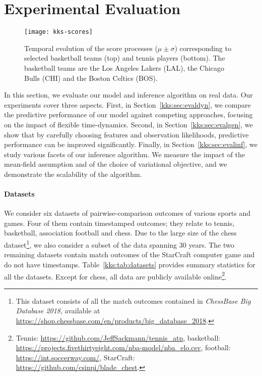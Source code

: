 \section{Experimental Evaluation}
\label{kks:sec:eval}

\begin{figure*}[t]
	\texttt{[image: kks-scores]}
	\caption{
		Temporal evolution of the score processes ($\mu \pm \sigma$) corresponding to selected basketball teams (top) and tennis players (bottom).
		The basketball teams are the Los Angeles Lakers (LAL), the Chicago Bulls (CHI) and the Boston Celtics (BOS).}
	\label{kks:fig:scores}
\end{figure*}

In this section, we evaluate our model and inference algorithm on real data.
Our experiments cover three aspects.
First, in Section~\ref{kks:sec:evaldyn}, we compare the predictive performance of our model against competing approaches, focusing on the impact of flexible time-dynamics.
Second, in Section~\ref{kks:sec:evalgen}, we show that by carefully choosing features and observation likelihoods, predictive performance can be improved significantly.
Finally, in Section~\ref{kks:sec:evalinf}, we study various facets of our inference algorithm.
We measure the impact of the mean-field assumption and of the choice of variational objective, and we demonstrate the scalability of the algorithm.

\paragraph{Datasets}
We consider six datasets of pairwise-comparison outcomes of various sports and games.
Four of them contain timestamped outcomes; they relate to tennis, basketball, association football and chess.
Due to the large size of the chess dataset\footnote{%
	This dataset consists of all the match outcomes contained in \emph{ChessBase Big Database 2018}, available at \url{https://shop.chessbase.com/en/products/big_database_2018}.}, we also consider a subset of the data spanning 30 years.
The two remaining datasets contain match outcomes of the StarCraft computer game and do not have timestamps.
Table~\ref{kks:tab:datasets} provides summary statistics for all the datasets.
Except for chess, all data are publicly available online\footnote{%
	Tennis: \url{https://github.com/JeffSackmann/tennis_atp},
	basketball: \url{https://projects.fivethirtyeight.com/nba-model/nba_elo.csv},
	football: \url{https://int.soccerway.com/},
	StarCraft: \url{https://github.com/csinpi/blade_chest}.
}.

